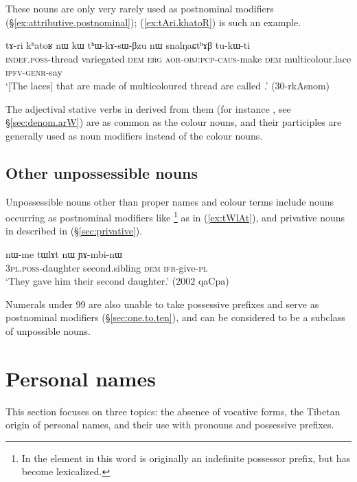 These nouns are only very rarely used as postnominal modifiers (§\ref{ex:attributive.postnominal}); (\ref{ex:tAri.khatoR}) is such an example.

\begin{exe}
\ex \label{ex:tAri.khatoR}
 \gll tɤ-ri kʰatoʁ nɯ kɯ tʰɯ-kɤ-sɯ-βzu nɯ snalŋaɕtʰɤβ tu-kɯ-ti \\
 \textsc{indef}.\textsc{poss}-thread variegated \textsc{dem} \textsc{erg} \textsc{aor}-\textsc{obj}:\textsc{pcp}-\textsc{caus}-make \textsc{dem} multicolour.lace \textsc{ipfv}-\textsc{genr}-say \\
 \glt `[The laces] that are made of multicoloured thread are called .' (30-rkAsnom) 
\end{exe}

The adjectival stative verbs in  derived from them (for instance , see §\ref{sec:denom.arW}) are as common as the colour nouns, and their participles are generally used as noun modifiers instead of the colour nouns.


\subsection{Other unpossessible nouns}  \label{sec:other.upn}
Unpossessible nouns other than proper names and colour terms include nouns occurring as postnominal modifiers like \footnote{In  the  element in this word is originally an indefinite possessor prefix, but has become lexicalized.} as in (\ref{ex:tWlAt}), and privative nouns in  described in (§\ref{sec:privative}).

\begin{exe}
\ex \label{ex:tWlAt}
\gll nɯ-me tɯlɤt nɯ ɲɤ-mbi-nɯ \\
\textsc{3pl}.\textsc{poss}-daughter second.sibling \textsc{dem} \textsc{ifr}-give-\textsc{pl} \\
\glt `They gave him their second daughter.' (2002 qaCpa)
\end{exe} 

Numerals under 99 are also unable to take possessive prefixes and serve as postnominal modifiers (§\ref{sec:one.to.ten}), and can be considered to be a subclass of unpossible nouns.

\section{Personal names} \label{sec:personal.names}
This section focuses on three topics: the absence of vocative forms, the Tibetan origin of personal names, and their use with pronouns and possessive prefixes. 

